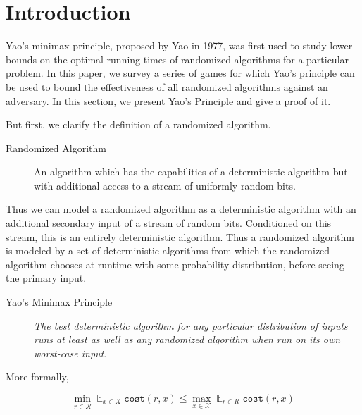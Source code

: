 \newcommand{\Expected}{\displaystyle\mathop{\mathds{E}}}
\newcommand{\argmin}{\displaystyle\mathop{\text{arg\;min}}}

\section{Introduction}

Yao's minimax principle, proposed by Yao in 1977, was first used to study lower bounds on the optimal running times of randomized algorithms for a particular problem. In this paper, we survey a series of games for which Yao's principle can be used to bound the effectiveness of all randomized algorithms against an adversary.
In this section, we present Yao's Principle and give a proof of it.

But first, we clarify the definition of a randomized algorithm.

\begin{description}
	\item[Randomized Algorithm] An algorithm which has the capabilities of a deterministic algorithm but with additional access to a stream of uniformly random bits.
\end{description}

Thus we can model a randomized algorithm as a deterministic algorithm with an additional secondary input of a stream of random bits. Conditioned on this stream, this is an entirely deterministic algorithm. Thus a randomized algorithm is modeled by a set of deterministic algorithms from which the randomized algorithm chooses at runtime with some probability distribution, before seeing the primary input.


\begin{description}
	\item[Yao's Minimax Principle] \emph{The best deterministic algorithm for any particular distribution of inputs runs at least as well as any randomized algorithm when run on its own worst-case input}.
\end{description}
More formally,

$$\min_{r \in \mathcal{R}} \Expected_{x \in X} \texttt{cost}(r, x) \leq \max_{x \in \mathcal{X}} \Expected_{r \in R} \texttt{cost}(r, x)$$

